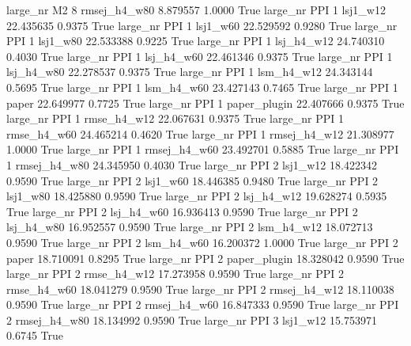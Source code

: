   large_nr       M2                 8 rmsej_h4_w80    8.879557      1.0000    True
  large_nr      PPI                 1     lsj1_w12   22.435635      0.9375    True
  large_nr      PPI                 1     lsj1_w60   22.529592      0.9280    True
  large_nr      PPI                 1     lsj1_w80   22.533388      0.9225    True
  large_nr      PPI                 1   lsj_h4_w12   24.740310      0.4030    True
  large_nr      PPI                 1   lsj_h4_w60   22.461346      0.9375    True
  large_nr      PPI                 1   lsj_h4_w80   22.278537      0.9375    True
  large_nr      PPI                 1   lsm_h4_w12   24.343144      0.5695    True
  large_nr      PPI                 1   lsm_h4_w60   23.427143      0.7465    True
  large_nr      PPI                 1        paper   22.649977      0.7725    True
  large_nr      PPI                 1 paper_plugin   22.407666      0.9375    True
  large_nr      PPI                 1  rmse_h4_w12   22.067631      0.9375    True
  large_nr      PPI                 1  rmse_h4_w60   24.465214      0.4620    True
  large_nr      PPI                 1 rmsej_h4_w12   21.308977      1.0000    True
  large_nr      PPI                 1 rmsej_h4_w60   23.492701      0.5885    True
  large_nr      PPI                 1 rmsej_h4_w80   24.345950      0.4030    True
  large_nr      PPI                 2     lsj1_w12   18.422342      0.9590    True
  large_nr      PPI                 2     lsj1_w60   18.446385      0.9480    True
  large_nr      PPI                 2     lsj1_w80   18.425880      0.9590    True
  large_nr      PPI                 2   lsj_h4_w12   19.628274      0.5935    True
  large_nr      PPI                 2   lsj_h4_w60   16.936413      0.9590    True
  large_nr      PPI                 2   lsj_h4_w80   16.952557      0.9590    True
  large_nr      PPI                 2   lsm_h4_w12   18.072713      0.9590    True
  large_nr      PPI                 2   lsm_h4_w60   16.200372      1.0000    True
  large_nr      PPI                 2        paper   18.710091      0.8295    True
  large_nr      PPI                 2 paper_plugin   18.328042      0.9590    True
  large_nr      PPI                 2  rmse_h4_w12   17.273958      0.9590    True
  large_nr      PPI                 2  rmse_h4_w60   18.041279      0.9590    True
  large_nr      PPI                 2 rmsej_h4_w12   18.110038      0.9590    True
  large_nr      PPI                 2 rmsej_h4_w60   16.847333      0.9590    True
  large_nr      PPI                 2 rmsej_h4_w80   18.134992      0.9590    True
  large_nr      PPI                 3     lsj1_w12   15.753971      0.6745    True
